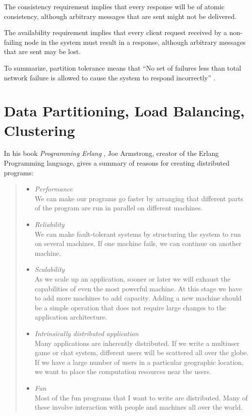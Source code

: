 The consistency requirement implies that every response will be of atomic consistency, although arbitrary messages that are sent might not be delivered.

The availability requirement implies that every client request received by a non-failing node in the system must result in a response, although arbitrary messages that are sent may be lost.

To summarize, partition tolerance means that ``No set of failures less than total network failure is allowed to cause the system to respond incorrectly'' \cite{GL02}.

\section{Data Partitioning, Load Balancing, Clustering}
\label{Data Partitioning, Load Balancing, Clustering}

In his book \emph{Programming Erlang} \cite[p.~175]{Arm07}, Joe Armstrong, creator of the Erlang Programming language, gives a summary of reasons for creating distributed programs:

\begin{quote}
  \begin{itemize}
	\item \emph{Performance}\\
	      We can make our programs go faster by arranging that different
	      parts of the program are run in parallel on different machines.
	\item \emph{Reliability}\\
	      We can make fault-tolerant systems by structuring the system to
	      run on several machines. If one machine fails, we can continue on
	      another machine.
	\item \emph{Scalability}\\
	      As we scale up an application, sooner or later we will exhaust
	      the capabilities of even the most powerful machine. At this stage
	      we have to add more machines to add capacity. Adding a new
	      machine should be a simple operation that does not require large
	      changes to the application architecture.
	\item \emph{Intrinsically distributed application}\\
	      Many applications are inherently distributed. If we write a
	      multiuser game or chat system, different users will be scattered
	      all over the globe. If we have a large number of users in a
	      particular geographic location, we want to place the computation
	      resources near the users.
	\item \emph{Fun}\\
	      Most of the fun programs that I want to write are distributed.
	      Many of these involve interaction with people and machines all
	      over the world.
  \end{itemize}
\end{quote}

